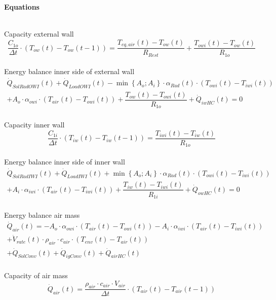 \begin{huge}
\textbf{Equations}
\end{huge}
\vspace{\spacing}
\\
Capacity external wall
\begin{equation}
\dfrac{C_{1o}}{\Delta t}\cdot \left( T_{ow}(t) - T_{ow}(t-1) \right) = \dfrac{T_{eq,air}(t) - T_{ow}(t)}{R_{Rest}} + \dfrac{T_{owi}(t) - T_{ow}(t)}{R_{1o}}
\end{equation}
\vspace{\spacing}
\\
Energy balance inner side of external wall
\begin{equation}
\begin{split}
\dot{Q}_{SolRadOWI}(t) +\dot{Q}_{LoadOWI}(t) 
-\min\left\lbrace A_o;A_i \right\rbrace \cdot \alpha_{Rad}(t) \cdot \left(T_{owi}(t) - T_{iwi}(t)\right)\\
+A_o \cdot \alpha_{owi} \cdot \left(T_{air}(t) - T_{owi}(t)\right) 
+\dfrac{T_{ow}(t) - T_{owi}(t)}{R_{1o}} + \dot{Q}_{iwHC}(t) = 0
\end{split}
\end{equation}
\vspace{\spacing}
\\
Capacity inner wall
\begin{equation}
\dfrac{C_{1i}}{\Delta t}\cdot \left( T_{iw}(t) - T_{iw}(t-1) \right) = \dfrac{T_{iwi}(t) - T_{iw}(t)}{R_{1o}}
\end{equation}
\vspace{\spacing}
\\
Energy balance inner side of inner wall
\begin{equation}
\begin{split}
\dot{Q}_{SolRadIWI}(t) +\dot{Q}_{LoadIWI}(t)
+\min\left\lbrace A_o;A_i \right\rbrace \cdot \alpha_{Rad}(t) \cdot \left(T_{owi}(t) - T_{iwi}(t)\right)\\
+A_i \cdot \alpha_{iwi}\cdot \left( T_{air}(t) - T_{iwi}(t) \right)
+\dfrac{T_{iw}(t) - T_{iwi}(t)}{R_{1i}} + \dot{Q}_{owHC}(t) = 0
\end{split}
\end{equation}
\vspace{\spacing}
\\
Energy balance air mass
\begin{equation}
\begin{split}
\dot{Q}_{air}(t) = -A_o \cdot \alpha_{owi} \cdot \left( T_{air}(t) - T_{owi}(t) \right) - A_i \cdot \alpha_{iwi} \cdot \left( T_{air}(t) - T_{iwi}(t) \right)\\
+ \dot{V}_{rate}(t) \cdot \rho_{air} \cdot c_{air} \cdot \left( T_{env}(t) - T_{air}(t) \right)\\
+ \dot{Q}_{SolConv}(t) + \dot{Q}_{igConv}(t) + \dot{Q}_{airHC}(t)
\end{split}
\end{equation}
\vspace{\spacing}
\\
Capacity of air mass
\begin{equation}
\dot{Q}_{air}(t) = \dfrac{\rho_{air} \cdot c_{air} \cdot V_{air}}{\Delta t} \cdot \left( T_{air}(t) - T_{air}(t-1) \right)
\end{equation}